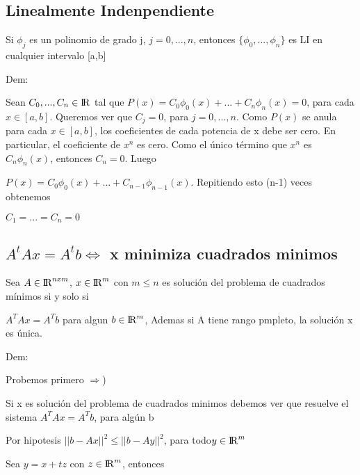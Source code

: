 \documentclass{article}
\begin{document}
\vspace{10mm}

\subsection{Linealmente Indenpendiente}\label{LI}

Si $\phi_j$ es un polinomio de grado j, $j = 0,...,n$, entonces $\{\phi_0,...,\phi_n\}$ es LI en cualquier intervalo [a,b]

\vspace{5mm}

Dem:

Sean $C_0,...,C_n \in {\rm I\!R}$ tal que $P(x) = C_0\phi_0(x)+...+C_n\phi_n(x) = 0$, para cada $x \in [a,b]$.
Queremos ver que $C_j = 0$, para $j = 0,...,n$. Como $P(x)$ se anula para cada $x \in [a,b]$, los coeficientes
de cada potencia de x debe ser cero. En particular, el coeficiente de $x^n$ es cero. Como el único término que 
$x^n$ es $C_n\phi_n(x)$, entonces $C_n = 0$. Luego

$P(x) = C_0\phi_0(x)+...+C_{n-1}\phi_{n-1}(x)$. Repitiendo esto (n-1) veces obtenemos

$C_1 = ... = C_n = 0$




\vspace{10mm}



\subsection{$A^tAx=A^tb\Leftrightarrow$  x minimiza cuadrados minimos}\label{Relacion-DIf-Divididas-con-derivada-n-esima}

Sea $A \in  {\rm I\!R}^{nxm}$, $x \in {\rm I\!R}^{m}$ con $m \leq n$ es solución del problema de cuadrados mínimos si y solo si

$A^TAx = A^Tb$ para algun $b \in {\rm I\!R}^{m}$, Ademas si A tiene rango pmpleto, la solución x es única.

Dem:

Probemos primero $\Rightarrow$)

Si x es solución del problema de cuadrados minimos debemos ver que resuelve el sistema $A^TAx = A^Tb$, para algún b

Por hipotesis $||b - Ax||^2 \leq ||b-Ay||^2$, para todo$y \in {\rm I\!R}^m$

Sea $y = x+ tz$ con $z \in {\rm I\!R}^m$, entonces

\vspace{5mm}
\end{document}

